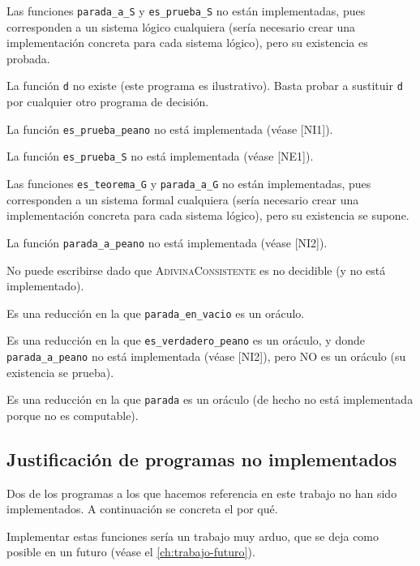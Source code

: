 \begin{enumerate}[label={[}NE\arabic*{]},wide = 0pt,widest={100}, leftmargin =*]
    \item Las funciones \texttt{parada\_a\_S} y \texttt{es\_prueba\_S} no están implementadas, pues corresponden a un sistema lógico cualquiera (sería necesario crear una implementación concreta para cada sistema lógico), pero su existencia es probada.
    \item La función \texttt{d} no existe (este programa es ilustrativo). Basta probar a sustituir \texttt{d} por cualquier otro programa de decisión.
    \item La función \texttt{es\_prueba\_peano} no está implementada (véase [NI1]).
    \item La función \texttt{es\_prueba\_S} no está implementada (véase [NE1]).
    \item Las funciones \texttt{es\_teorema\_G} y \texttt{parada\_a\_G} no están implementadas, pues corresponden a un sistema formal cualquiera (sería necesario crear una implementación concreta para cada sistema lógico), pero su existencia se supone.
    \item La función \texttt{parada\_a\_peano} no está implementada (véase [NI2]).
    \item No puede escribirse dado que \textsc{AdivinaConsistente} es no decidible (y no está implementado).
    \item Es una reducción en la que \texttt{parada\_en\_vacio} es un oráculo.
    \item Es una reducción en la que \texttt{es\_verdadero\_peano} es un oráculo, y donde \texttt{parada\_a\_peano} no está implementada (véase [NI2]), pero NO es un oráculo (su existencia se prueba).
    \item Es una reducción en la que \texttt{parada} es un oráculo (de hecho no está implementada porque no es computable).
\end{enumerate}

\subsection*{Justificación de programas no implementados}

Dos de los programas a los que hacemos referencia en este trabajo no han sido implementados. A continuación se concreta el por qué.

\begin{enumerate}[label={[}NI\arabic*{]},wide = 0pt,widest={NI1,NI}, leftmargin =*]
    \item[{[}NI1, NI2{]}] Implementar estas funciones sería un trabajo muy arduo, que se deja como posible en un futuro (véase el \cref{ch:trabajo-futuro}).
\end{enumerate}

\endinput
